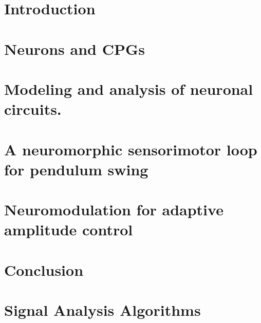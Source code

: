 \documentclass[12pt, twoside]{report}
\newcommand{\mychaptername}{Undefined}
\newcommand{\mychapterdesignation}{Chapter}
\newcommand{\mychapter}[1]{\chapter{#1}\renewcommand{\mychaptername}{\mychapterdesignation~\thechapter : #1}}
\begin{document}
    
    
    
    \renewcommand{\mychaptername}{Abstract}



    
    
    \tableofcontents
    \renewcommand{\mychaptername}{Contents}
    

    \mychapter{Introduction}
    
    
    \mychapter{Neurons and CPGs}
    
    
    \mychapter{Modeling and analysis of neuronal circuits.}
    

    \mychapter{A neuromorphic sensorimotor loop for pendulum swing}
    

    \mychapter{Neuromodulation for adaptive amplitude control}
    


    \mychapter{Conclusion}
    
    \newpage
    \renewcommand{\mychaptername}{Bibliography}
    
    
    
    \newpage
    \appendix
    \renewcommand{\mychapterdesignation}{Appendix}
    \mychapter{Signal Analysis Algorithms}
\end{document}
